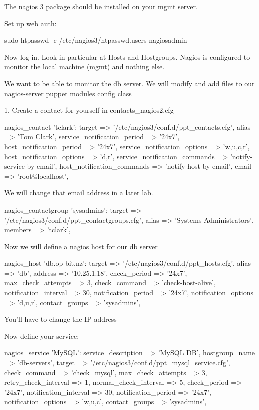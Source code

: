 The nagios 3 package should be installed on your mgmt server.

Set up web auth:

sudo htpasswd -c /etc/nagios3/htpasswd.users nagiosadmin

Now log in.  Look in particular at Hosts and Hostgroups.  Nagios is configured
to monitor the local machine (mgmt) and nothing else.

We want to be able to monitor the db server.  We will modify and add files to
our nagios-server puppet modules config class

1.  Create a contact for yourself in contacts_nagios2.cfg

nagios_contact { 'tclark':
              target => '/etc/nagios3/conf.d/ppt_contacts.cfg',
              alias => 'Tom Clark',
              service_notification_period => '24x7',
              host_notification_period => '24x7',
              service_notification_options => 'w,u,c,r',
              host_notification_options => 'd,r',
              service_notification_commands => 'notify-service-by-email',
              host_notification_commands => 'notify-host-by-email',
              email => 'root@localhost',
  }


We will change that email address in a later lab.


 nagios_contactgroup { 'sysadmins':
               target => '/etc/nagios3/conf.d/ppt_contactgroups.cfg',
               alias => 'Systems Administrators',
               members => 'tclark', 
  }



Now we will define a nagios host for our db server

 nagios_host { 'db.op-bit.nz':
                 target => '/etc/nagios3/conf.d/ppt_hosts.cfg',
                 alias => 'db',
                 address => '10.25.1.18',
                 check_period => '24x7',
                 max_check_attempts => 3,
                 check_command => 'check-host-alive',
                 notification_interval => 30,
                 notification_period => '24x7',
                 notification_options => 'd,u,r',
                 contact_groups => 'sysadmins',
              }

You'll have to change the IP address 

Now define your service:

nagios_service {'MySQL':
              service_description => 'MySQL DB',
              hostgroup_name => 'db-servers',
              target => '/etc/nagios3/conf.d/ppt_mysql_service.cfg',
              check_command => 'check_mysql',
              max_check_attempts => 3,
              retry_check_interval => 1,
              normal_check_interval => 5,
              check_period => '24x7',
              notification_interval => 30,
              notification_period => '24x7',
              notification_options => 'w,u,c',
              contact_groups => 'sysadmins',
  }


